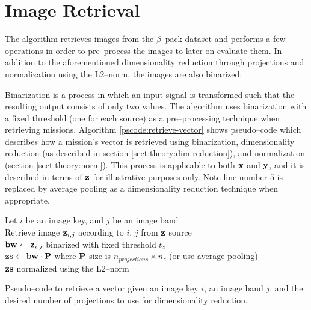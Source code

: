 \section{Image Retrieval} \label{sect:meth:image-retrieval}

The \mlblink algorithm retrieves images from the $\beta$--pack dataset and performs a few operations in order to pre--process the images to later on evaluate them. In addition to the aforementioned dimensionality reduction through projections and normalization using the L2--norm, the images are also binarized. \newline

Binarization is a process in which an input signal is transformed such that the resulting output consists of only two values. The \mlblink algorithm uses binarization with a fixed threshold (one for each source) as a pre--processing technique when retrieving missions. Algorithm \ref{pscode:retrieve-vector} shows pseudo--code which describes how a mission's vector is retrieved using binarization, dimensionality reduction (as described in section \ref{sect:theory:dim-reduction}), and normalization (section \ref{sect:theory:norm}). This process is applicable to both $\boldsymbol{\mathbf{x}}$ and $\boldsymbol{\mathbf{y}}$, and it is described in terms of $\boldsymbol{\mathbf{z}}$ for illustrative purposes only. Note line number $5$ is replaced by average pooling as a dimensionality reduction technique when appropriate.

\vspace{0.4cm}
\begin{algorithm}[H]
    \SetAlgoLined
         {
            Let $i$ be an image key, and $j$ be an image band \\
            Retrieve image $\boldsymbol{\mathbf{z}}_{i,j}$ according to $i$, $j$ from $\boldsymbol{\mathbf{z}}$ source \\
            $\boldsymbol{\mathbf{bw}} \gets \boldsymbol{\mathbf{z}}_{i,j}$ binarized with fixed threshold $t_z$ \\
            $\boldsymbol{\mathbf{zs}} \gets \boldsymbol{\mathbf{bw}} \cdot \boldsymbol{\mathbf{P}}$ where $\boldsymbol{\mathbf{P}}$ size is $n_{projections} \times n_z$ (or use average pooling) \\
            \Return $\boldsymbol{\mathbf{zs}}$ normalized using the L2--norm
        }
    \caption{Pseudo--code to retrieve a vector given an image key $i$, an image band $j$, and the desired number of projections to use for dimensionality reduction.}
    \label{pscode:retrieve-vector}
\end{algorithm}
\vspace{0.4cm}